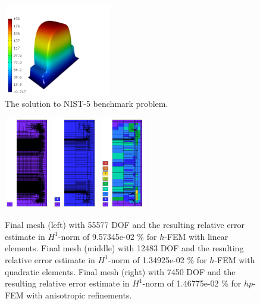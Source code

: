 \documentclass[12pt]{elsarticle}
\begin{document}
\begin{figure}[!ht]
\centering
\vspace{-5mm}
\includegraphics[height=4cm]{nist/nist-5/solution.png}
\vspace{-2mm}
\caption{The solution to NIST-5 benchmark problem.}
\label{fig:sln-nist05}
\end{figure}

\begin{figure}[!ht]
\centering
\vspace{-4mm}
\includegraphics[height=4cm]{nist/nist-5/mesh_h1_aniso.png}
\includegraphics[height=4cm]{nist/nist-5/mesh_h2_aniso.png}
\includegraphics[height=4cm]{nist/nist-5/mesh_hp_aniso.png}
\vspace{-2mm}
\caption{
Final mesh (left) with 55577 DOF and the resulting
relative error estimate in $H^1$-norm of 9.57345e-02 \% for $h$-FEM with linear elements.
Final mesh (middle) with 12483 DOF and the resulting
relative error estimate in $H^1$-norm of 1.34925e-02 \% for $h$-FEM with quadratic elements.
Final mesh (right) with 7450 DOF and the resulting
relative error estimate in $H^1$-norm of 1.46775e-02 \% for $hp$-FEM with anisotropic refinements.}
\vspace{-3mm}
\label{fig:nist-5-hp-aniso}
\end{figure}
\end{document}
